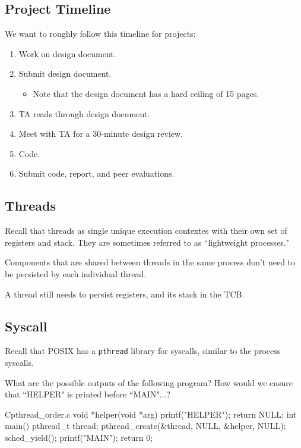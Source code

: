 \documentclass[openany]{book}
\begin{document}
\subsection{Project Timeline}
We want to roughly follow this timeline for projects:
\begin{enumerate}
	\item Work on design document.
	\item Submit design document.
	\begin{itemize}
		\item Note that the design document has a hard ceiling of 15 pages.
	\end{itemize}
	\item TA reads through design document.
	\item Meet with TA for a 30-minute design review.
	\item Code.
	\item Submit code, report, and peer evaluations.
\end{enumerate}

\subsection{Threads}
Recall that threads as single unique execution contextes with their own set of registers and stack. They are sometimes referred to as ``lightweight processes."

Components that are shared between threads in the same process don't need to be persisted by each individual thread.

A thread still needs to persist registers, and its stack in the TCB.

\subsection{Syscall}
Recall that POSIX has a \texttt{pthread} library for syscalls, similar to the process syscalls.

\begin{hw}
	What are the possible outputs of the following program? How would we ensure that ``HELPER" is printed before ``MAIN"...?
\end{hw}

\begin{code}{C}{pthread\_order.c}
void *helper(void *arg) {
	printf("HELPER");
	return NULL;
}
int main() {
	pthread_t thread;
	pthread_create(&thread, NULL, &helper, NULL);
	sched_yield();
	printf("MAIN");
	return 0;
}
\end{code}
\end{document}
